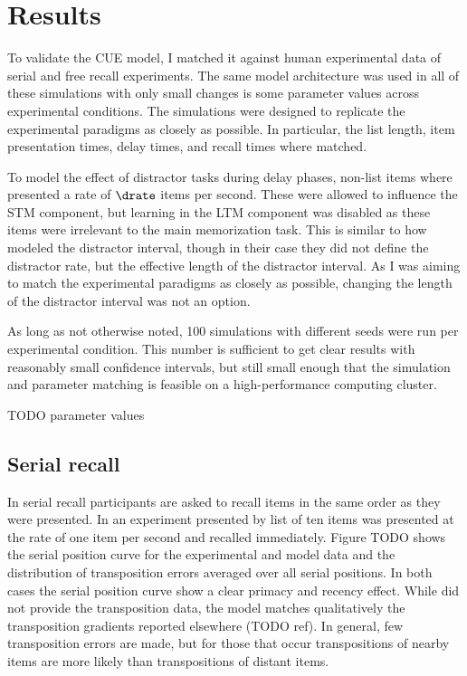 \chapter{Results}
To validate the CUE model, I matched it against human experimental data of serial and free recall experiments.
The same model architecture was used in all of these simulations with only small changes is some parameter values across experimental conditions.
The simulations were designed to replicate the experimental paradigms as closely as possible.
In particular, the list length, item presentation times, delay times, and recall times where matched.

To model the effect of distractor tasks during delay phases, non-list items where presented a rate of $\drate$ items per second.
These were allowed to influence the STM component, but learning in the LTM component was disabled as these items were irrelevant to the main memorization task.
This is similar to how \textcite{Howard2002} modeled the distractor interval, though in their case they did not define the distractor rate, but the effective length of the distractor interval.
As I was aiming to match the experimental paradigms as closely as possible, changing the length of the distractor interval was not an option.

As long as not otherwise noted, 100 simulations with different seeds were run per experimental condition.
This number is sufficient to get clear results with reasonably small confidence intervals, but still small enough that the simulation and parameter matching is feasible on a high-performance computing cluster.


TODO parameter values


\section{Serial recall}
In serial recall participants are asked to recall items in the same order as they were presented.
In an experiment presented by \textcite{Jahnke1968} list of ten items was presented at the rate of one item per second and recalled immediately.
Figure TODO shows the serial position curve for the experimental and model data and the distribution of transposition errors averaged over all serial positions.
In both cases the serial position curve show a clear primacy and recency effect.
While \textcite{Jahnke1968} did not provide the transposition data, the model matches qualitatively the transposition gradients reported elsewhere (TODO ref).
In general, few transposition errors are made, but for those that occur transpositions of nearby items are more likely than transpositions of distant items.

